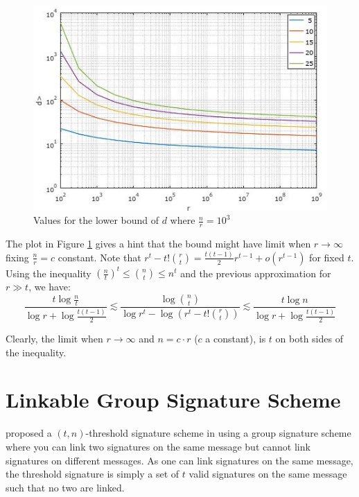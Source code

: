 \begin{figure}[H]
    \begin{center}
        \includegraphics[scale=1.5]{images/phf.jpg}
    \end{center}

    \caption{Values for the lower bound of $d$ where $\frac{n}{r} = 10^3$}
    \label{fig:phf} 
\end{figure}

The plot in Figure \ref{fig:phf} gives a hint that the bound might have limit when $r \rightarrow \infty$ fixing $\frac{n}{r}=c$ constant. Note that $r^t - t! \binom{r}{t} = \frac{t(t-1)}{2}r^{t-1} + o(r^{t-1})$ for fixed $t$. Using the inequality $ \left( \frac{n}{t} \right)^t \leq \binom{n}{t} \leq n^t$ and the previous approximation for $r \gg t$, we have:
$$\frac{t \log \frac{n}{t}}{\log r + \log \frac{t(t-1)}{2}} \lesssim \frac{\log \binom{n}{t}}{\log r^t - \log (r^t - t! \binom{r}{t})} \lesssim \frac{t \log n}{\log r + \log \frac{t(t-1)}{2}}$$

Clearly, the limit when $r \rightarrow \infty$ and $n = c \cdot r$ ($c$ a constant), is $t$ on both sides of the inequality.

\section{Linkable Group Signature Scheme}
\citeauthor{ChenNW11} proposed a $(t,n)$-threshold signature scheme in \cite{ChenNW11} using a group signature scheme where you can link two signatures on the same message but cannot link signatures on different messages. As one can link signatures on the same message, the threshold signature is simply a set of $t$ valid signatures on the same message such that no two are linked.
